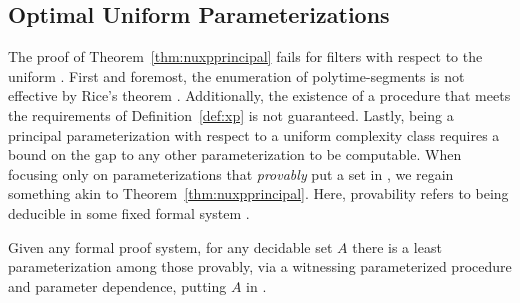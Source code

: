 \subsection{Optimal Uniform Parameterizations}
\label{sec:optimal_uniform_parameterizations}%
The proof of Theorem~\ref{thm:nuxpprincipal} fails for filters with respect to the uniform .
First and foremost, the enumeration of polytime-segments is not effective by Rice's theorem \parencite{rice1953classes}.
Additionally, the existence of a procedure that meets the requirements of Definition~\ref{def:xp} is not guaranteed.
Lastly, being a principal parameterization with respect to a uniform complexity class requires a bound on the gap to any other parameterization to be computable.
When focusing only on parameterizations that \emph{provably} put a set in , we regain something akin to Theorem~\ref{thm:nuxpprincipal}.
Here, provability refers to being deducible in some fixed formal system \parencite{kleene1967mathematical}.
\begin{theorem}
\label{thm:xpprincipal}%
  Given any formal proof system, for any decidable set $A$ there is a least parameterization among those provably, via a witnessing parameterized procedure and parameter dependence, putting $A$ in .
\end{theorem}
